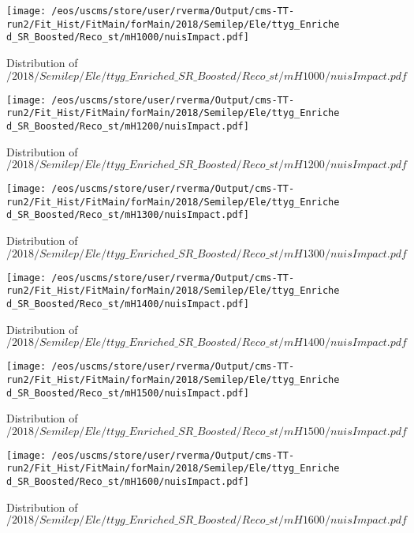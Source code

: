 \begin{figure}
\centering
\texttt{[image: /eos/uscms/store/user/rverma/Output/cms-TT-run2/Fit\_Hist/FitMain/forMain/2018/Semilep/Ele/ttyg\_Enriched\_SR\_Boosted/Reco\_st/mH1000/nuisImpact.pdf]}
\caption{Distribution of $/2018/Semilep/Ele/ttyg\_Enriched\_SR\_Boosted/Reco\_st/mH1000/nuisImpact.pdf$}
\end{figure}

\begin{figure}
\centering
\texttt{[image: /eos/uscms/store/user/rverma/Output/cms-TT-run2/Fit\_Hist/FitMain/forMain/2018/Semilep/Ele/ttyg\_Enriched\_SR\_Boosted/Reco\_st/mH1200/nuisImpact.pdf]}
\caption{Distribution of $/2018/Semilep/Ele/ttyg\_Enriched\_SR\_Boosted/Reco\_st/mH1200/nuisImpact.pdf$}
\end{figure}

\begin{figure}
\centering
\texttt{[image: /eos/uscms/store/user/rverma/Output/cms-TT-run2/Fit\_Hist/FitMain/forMain/2018/Semilep/Ele/ttyg\_Enriched\_SR\_Boosted/Reco\_st/mH1300/nuisImpact.pdf]}
\caption{Distribution of $/2018/Semilep/Ele/ttyg\_Enriched\_SR\_Boosted/Reco\_st/mH1300/nuisImpact.pdf$}
\end{figure}

\begin{figure}
\centering
\texttt{[image: /eos/uscms/store/user/rverma/Output/cms-TT-run2/Fit\_Hist/FitMain/forMain/2018/Semilep/Ele/ttyg\_Enriched\_SR\_Boosted/Reco\_st/mH1400/nuisImpact.pdf]}
\caption{Distribution of $/2018/Semilep/Ele/ttyg\_Enriched\_SR\_Boosted/Reco\_st/mH1400/nuisImpact.pdf$}
\end{figure}

\begin{figure}
\centering
\texttt{[image: /eos/uscms/store/user/rverma/Output/cms-TT-run2/Fit\_Hist/FitMain/forMain/2018/Semilep/Ele/ttyg\_Enriched\_SR\_Boosted/Reco\_st/mH1500/nuisImpact.pdf]}
\caption{Distribution of $/2018/Semilep/Ele/ttyg\_Enriched\_SR\_Boosted/Reco\_st/mH1500/nuisImpact.pdf$}
\end{figure}

\begin{figure}
\centering
\texttt{[image: /eos/uscms/store/user/rverma/Output/cms-TT-run2/Fit\_Hist/FitMain/forMain/2018/Semilep/Ele/ttyg\_Enriched\_SR\_Boosted/Reco\_st/mH1600/nuisImpact.pdf]}
\caption{Distribution of $/2018/Semilep/Ele/ttyg\_Enriched\_SR\_Boosted/Reco\_st/mH1600/nuisImpact.pdf$}
\end{figure}

